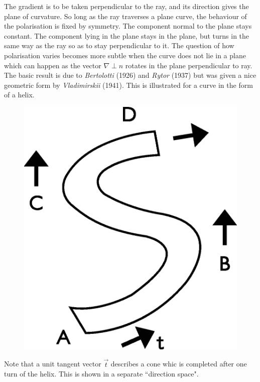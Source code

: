 The gradient is to be taken perpendicular to the ray, and its direction gives
the plane of curvature. So long as the ray traverses a plane curve, the behaviour
of the polarisation is fixed by symmetry. The component normal to the plane
stays constant. The component lying in the plane stays in the plane, but
turns in the same way as the ray so as to stay perpendicular to it. The question
of how polarisation varies becomes more subtle when the curve does not lie in
a plane which can happen as the vector $\nabla \perp n $ rotates in the plane perpendicular
to ray. The basic result is due to \textit{Bertolotti} (1926) and \textit{Rytor} (1937) but was
given a nice geometric form by \textit{Vladimirskii} (1941). This is illustrated for a curve in
the form of a helix.
\bigskip

\begin{figure}[H]
\centering
\includegraphics[scale=0.14]{src/images/chap26/20.jpg}
\end{figure}
\bigskip

Note that a unit tangent vector $\overrightarrow{t}$ describes a cone whic is completed after
one turn of the helix. This is shown in a separate ``direction space".
\bigskip

